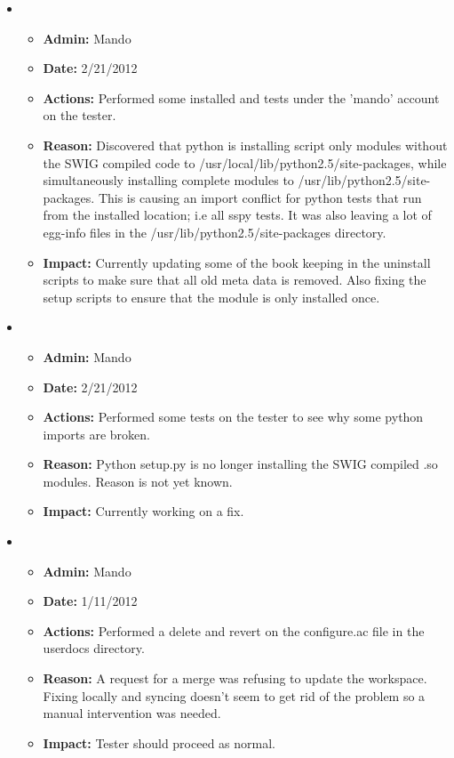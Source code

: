 \documentclass[12pt]{article}
\begin{document}
\begin{itemize}

\item
  \begin{itemize}
  \item[] {\bf Admin:} Mando
  \item[] {\bf Date:} 2/21/2012
  \item[] {\bf Actions:} Performed some installed and tests under the 'mando' account on the tester.
  \item[] {\bf Reason:} Discovered that python is installing script only modules without the SWIG compiled code to /usr/local/lib/python2.5/site-packages, while simultaneously installing complete modules to /usr/lib/python2.5/site-packages. This is causing an import conflict for python tests that run from the installed location; i.e all sspy tests. It was also leaving a lot of egg-info files in the /usr/lib/python2.5/site-packages directory.
  \item[] {\bf Impact:} Currently updating some of the book keeping in the uninstall scripts to make sure that all old meta data is removed. Also fixing the setup scripts to ensure that the module is only installed once.
  \end{itemize}
  
\item
  \begin{itemize}
  \item[] {\bf Admin:} Mando
  \item[] {\bf Date:} 2/21/2012
  \item[] {\bf Actions:} Performed some tests on the tester to see why some python imports are broken.
  \item[] {\bf Reason:} Python setup.py is no longer installing the SWIG compiled .so modules. Reason is not yet known.
  \item[] {\bf Impact:} Currently working on a fix.
  \end{itemize}
  
\item
  \begin{itemize}
  \item[] {\bf Admin:} Mando
  \item[] {\bf Date:} 1/11/2012
  \item[] {\bf Actions:} Performed a delete and revert on the configure.ac file in the userdocs directory.
  \item[] {\bf Reason:} A request for a merge was refusing to update the workspace. Fixing locally and syncing doesn't seem to get rid of the problem so a manual intervention was needed. 
  \item[] {\bf Impact:} Tester should proceed as normal.
  \end{itemize}
  

\end{itemize}
\end{document}
